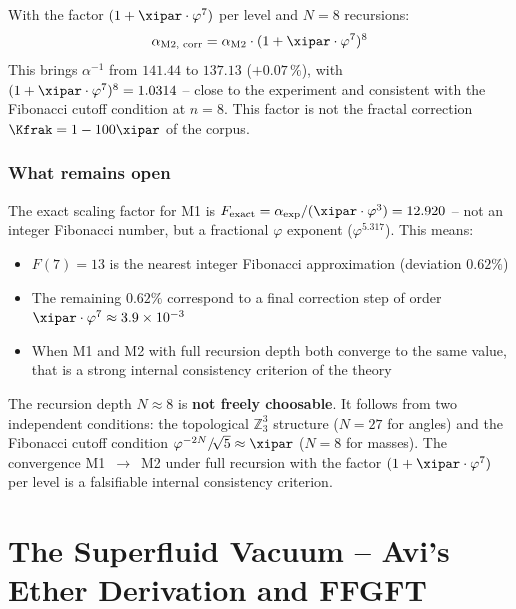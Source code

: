 With the factor $(1 + \xipar\cdot\varphi^7)$ per level and $N = 8$ recursions:
\[
  \alpha_{\text{M2, corr}} = \alpha_{\text{M2}} \cdot (1 + \xipar\cdot\varphi^7)^8
\]
This brings $\alpha^{-1}$ from $141.44$ to $137.13$ ($+0.07\,\%$), with $(1 + \xipar\cdot\varphi^7)^8 = 1.0314$ -- close to the experiment and consistent with the Fibonacci cutoff condition at $n=8$. This factor is not the fractal correction $\Kfrak = 1-100\xipar$ of the corpus.

\subsubsection*{What remains open}

The exact scaling factor for M1 is $F_{\text{exact}} = \alpha_{\text{exp}}/(\xipar\cdot\varphi^3) = 12.920$ -- not an integer Fibonacci number, but a fractional $\varphi$ exponent ($\varphi^{5.317}$). This means:

\begin{itemize}[noitemsep]
  \item $F(7) = 13$ is the nearest integer Fibonacci approximation (deviation $0.62\%$)
  \item The remaining $0.62\%$ correspond to a final correction step of order $\xipar\cdot\varphi^7 \approx 3.9 \times 10^{-3}$
  \item When M1 and M2 with full recursion depth both converge to the same value, that is a strong internal consistency criterion of the theory
\end{itemize}

\begin{tcolorbox}[colback=T0gray, colframe=T0blue, title=Convergence criterion]
The recursion depth $N \approx 8$ is \textbf{not freely choosable}. It follows from two independent conditions: the topological $\mathbb{Z}_3^3$ structure ($N=27$ for angles) and the Fibonacci cutoff condition $\varphi^{-2N}/\!\sqrt{5} \approx \xipar$ ($N=8$ for masses). The convergence M1~$\to$~M2 under full recursion with the factor $(1 + \xipar\cdot\varphi^7)$ per level is a falsifiable internal consistency criterion.
\end{tcolorbox}

\section{The Superfluid Vacuum -- Avi's Ether Derivation and FFGFT}

